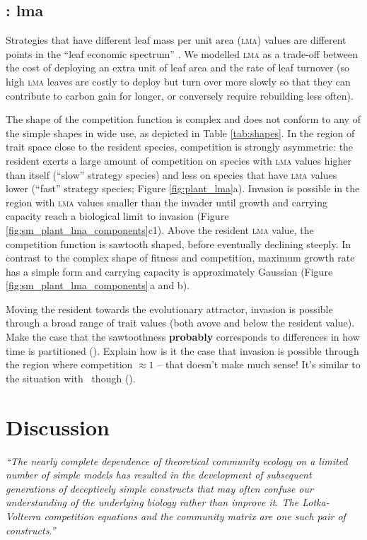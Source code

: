 \documentclass[a4paper,11pt]{article}
\begin{document}
\subsection{\plant: lma}
Strategies that have different leaf mass per unit area (\textsc{lma})
values are different points in the ``leaf economic spectrum''
\citep{Reich-1997,Wright-2004}.  We modelled \textsc{lma} as a trade-off
between the cost of deploying an extra unit
of leaf area and the rate of leaf turnover (so high \textsc{lma} leaves are
costly to deploy but turn over more slowly so that they can contribute
to carbon gain for longer, or conversely require rebuilding less
often).

The shape of the competition function is complex and does not conform
to any of the simple shapes in wide use, as depicted in Table \ref{tab:shapes}.
In the region of trait space close to the resident species,
competition is strongly asymmetric: the resident exerts a large amount
of competition on species with \textsc{lma} values higher than itself (``slow''
strategy species) and less on species that have \textsc{lma} values lower
(``fast'' strategy species; Figure \ref{fig:plant_lma}a).  Invasion is
possible in the region with \textsc{lma} values smaller than the invader until
growth and carrying capacity reach a biological limit to invasion
(Figure \ref{fig:sm_plant_lma_components}c1).
%
Above the resident \textsc{lma} value, the competition function is sawtooth
shaped, before eventually declining steeply.
%
In contrast to the complex shape of fitness and competition, maximum
growth rate has a simple form and carrying capacity is approximately
Gaussian (Figure \ref{fig:sm_plant_lma_components}\,a and b).

Moving the resident towards the evolutionary attractor, invasion is
possible through a broad range of trait values (both avove and below
the resident value).
%
Make the case that the sawtoothness \textbf{probably} corresponds to
differences in how time is partitioned (\TODO).
%
Explain how is it the case that invasion is possible through the
region where competition $\approx 1$ -- that doesn't make much sense!
It's similar to the situation with \hmat\ though (\TODO).

\section{Discussion}

\emph{``The nearly complete dependence of theoretical community ecology on a
limited number of simple models has resulted in the development of subsequent
generations of deceptively simple constructs that may often confuse our
understanding of the underlying biology rather than improve it. The
Lotka-Volterra competition equations and the community matrix are one such
pair of constructs.''} \citep{Neill-1974}
\end{document}
